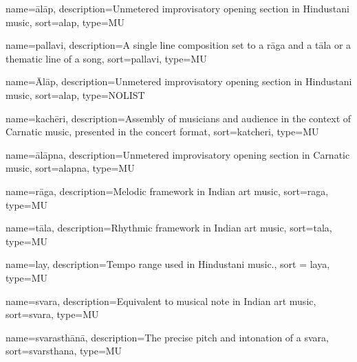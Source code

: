 





{
	name={\={a}l\={a}p},
	description={Unmetered improvisatory opening section in Hindustani music},
	sort=alap,
	type=MU
}

{
	name={pallavi},
	description={A single line composition set to a r\={a}ga and a t\={a}la or a thematic line of a song},
	sort=pallavi,
	type=MU
}


{
	name={\={A}l\={a}p},
	description={Unmetered improvisatory opening section in Hindustani music},
	sort=alap,
	type=NOLIST
}

{
	name={kach\={e}ri},
	description={Assembly of musicians and audience in the context of Carnatic music, presented in the concert format},
	sort=katcheri,
	type=MU
}

{
	name={\={a}l\={a}pna},
	description={Unmetered improvisatory opening section in Carnatic music},
	sort=alapna,
	type=MU	
}

{
  name={r\={a}ga},
  description={Melodic framework in Indian art music},
  sort=raga,
	type=MU  
}

{
	name={t\={a}la},
	description={Rhythmic framework in Indian art music},
	sort=tala,
	type=MU
}

{
	name={lay},
	description={Tempo range used in Hindustani music.},
	sort = laya,
	type=MU	
}

{
	name={svara},
	description={Equivalent to musical note in Indian art music},
	sort=svara,
	type=MU
}

{
	name={svarasth\={a}n\={a}},
	description={The precise pitch and intonation of a svara},
	sort=svarsthana,
	type=MU
}

